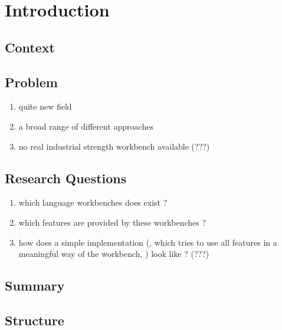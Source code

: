 \chapter{Introduction}

\section{Context}
\newpage

\section{Problem}

\begin{enumerate}
  \item quite new field
  \item a broad range of different approaches
  \item no real industrial strength workbench available (???)
\end{enumerate}

\newpage

\section{Research Questions}

\begin{enumerate}
  \item which language workbenches does exist ?
  \item which features are provided by these workbenches ?
  \item how does a simple implementation (, which tries to use all features in a meaningful way of the workbench, ) look like ? (???)
\end{enumerate}

\newpage


\section{Summary}
\newpage


\section{Structure}